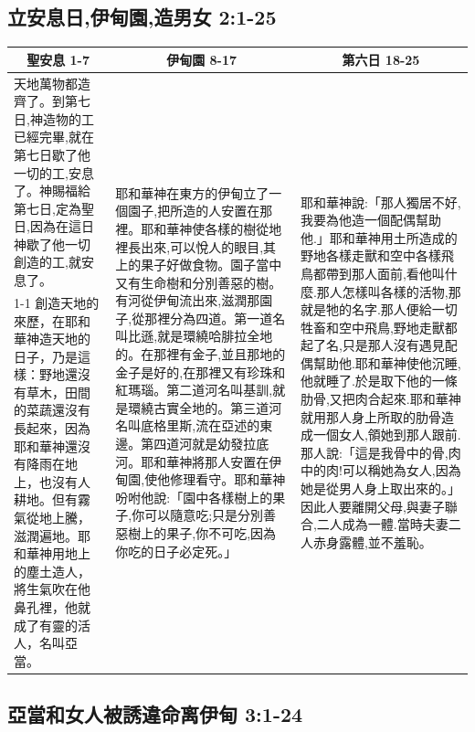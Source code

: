 \subsection{立安息日,伊甸園,造男女 2:1-25}
\begin{table}[H]
\centering
\begin{tabular}{p{4.75cm}|p{6.25cm}|p{5.75cm}}\hline\hline
\multicolumn{1}{c|}{聖安息 1-7}&\multicolumn{1}{c|}{伊甸園 8-17}&\multicolumn{1}{c}{第六日 18-25}\\\hline
天地萬物都造齊了。到第七日,神造物的工已經完畢,就在第七日歇了他一切的工,安息了。神賜福給第七日,定為聖日,因為在這日神歇了他一切創造的工,就安息了。
&\multirow{2}{6.5cm}{耶和華神在東方的伊甸立了一個園子,把所造的人安置在那裡。耶和華神使各樣的樹從地裡長出來,可以悅人的眼目,其上的果子好做食物。園子當中又有生命樹和分別善惡的樹。有河從伊甸流出來,滋潤那園子,從那裡分為四道。第一道名叫比遜,就是環繞哈腓拉全地的。在那裡有金子,並且那地的金子是好的,在那裡又有珍珠和紅瑪瑙。第二道河名叫基訓,就是環繞古實全地的。第三道河名叫底格里斯,流在亞述的東邊。第四道河就是幼發拉底河。耶和華神將那人安置在伊甸園,使他修理看守。耶和華神吩咐他說:「園中各樣樹上的果子,你可以隨意吃;只是分別善惡樹上的果子,你不可吃,因為你吃的日子必定死。」}
&\multirow{2}{6cm}{耶和華神說:「那人獨居不好,我要為他造一個配偶幫助他.」耶和華神用土所造成的野地各樣走獸和空中各樣飛鳥都帶到那人面前,看他叫什麼.那人怎樣叫各樣的活物,那就是牠的名字.那人便給一切牲畜和空中飛鳥,野地走獸都起了名,只是那人沒有遇見配偶幫助他.耶和華神使他沉睡,他就睡了.於是取下他的一條肋骨,又把肉合起來.耶和華神就用那人身上所取的肋骨造成一個女人,領她到那人跟前.那人說:「這是我骨中的骨,肉中的肉!可以稱她為女人,因為她是從男人身上取出來的。」因此人要離開父母,與妻子聯合,二人成為一體.當時夫妻二人赤身露體,並不羞恥。}\\\cline{1-1}
創造天地的來歷，在耶和華神造天地的日子，乃是這樣：野地還沒有草木，田間的菜蔬還沒有長起來，因為耶和華神還沒有降雨在地上，也沒有人耕地。但有霧氣從地上騰，滋潤遍地。耶和華神用地上的塵土造人，將生氣吹在他鼻孔裡，他就成了有靈的活人，名叫亞當。&&\\\hline
\end{tabular}
\end{table}

\subsection{亞當和女人被誘違命离伊甸 3:1-24}
